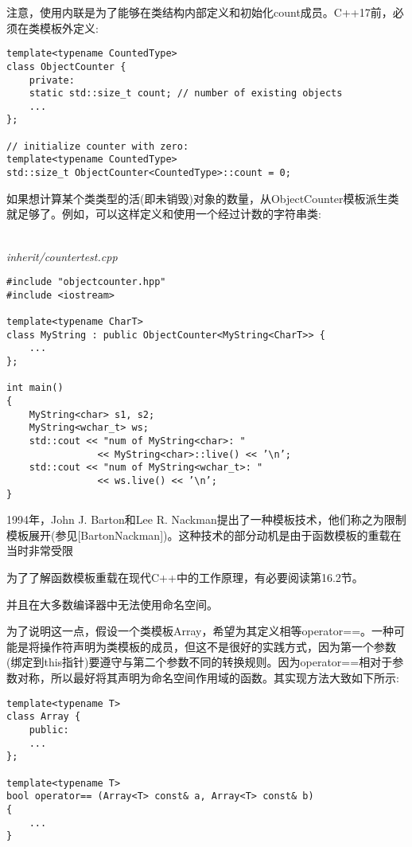 注意，使用内联是为了能够在类结构内部定义和初始化count成员。C++17前，必须在类模板外定义:

\begin{lstlisting}[style=styleCXX]
template<typename CountedType>
class ObjectCounter {
	private:
	static std::size_t count; // number of existing objects
	...
};

// initialize counter with zero:
template<typename CountedType>
std::size_t ObjectCounter<CountedType>::count = 0;
\end{lstlisting}

如果想计算某个类类型的活(即未销毁)对象的数量，从ObjectCounter模板派生类就足够了。例如，可以这样定义和使用一个经过计数的字符串类:

\hspace*{\fill} \\ %
\noindent
\textit{inherit/countertest.cpp}
\begin{lstlisting}[style=styleCXX]
#include "objectcounter.hpp"
#include <iostream>

template<typename CharT>
class MyString : public ObjectCounter<MyString<CharT>> {
	...
};

int main()
{
	MyString<char> s1, s2;
	MyString<wchar_t> ws;
	std::cout << "num of MyString<char>: "
				<< MyString<char>::live() << ’\n’;
	std::cout << "num of MyString<wchar_t>: "
				<< ws.live() << ’\n’;
}
\end{lstlisting}


1994年，John J. Barton和Lee R. Nackman提出了一种模板技术，他们称之为限制模板展开(参见[BartonNackman])。这种技术的部分动机是由于函数模板的重载在当时非常受限

\begin{tcolorbox}[colback=webgreen!5!white,colframe=webgreen!75!black]
\hspace*{0.75cm}为了了解函数模板重载在现代C++中的工作原理，有必要阅读第16.2节。
\end{tcolorbox}

并且在大多数编译器中无法使用命名空间。

为了说明这一点，假设一个类模板Array，希望为其定义相等operator==。一种可能是将操作符声明为类模板的成员，但这不是很好的实践方式，因为第一个参数(绑定到this指针)要遵守与第二个参数不同的转换规则。因为operator==相对于参数对称，所以最好将其声明为命名空间作用域的函数。其实现方法大致如下所示:

\begin{lstlisting}[style=styleCXX]
template<typename T>
class Array {
	public:
	...
};

template<typename T>
bool operator== (Array<T> const& a, Array<T> const& b)
{
	...
}
\end{lstlisting}

